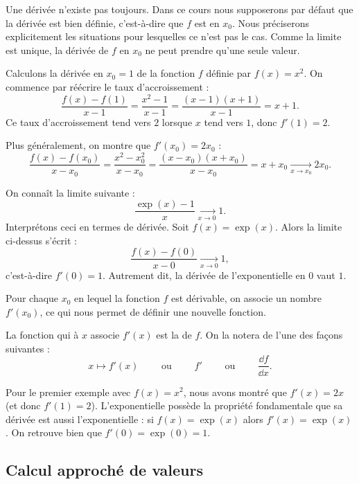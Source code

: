 \documentclass[11pt,class=report,crop=false]{standalone}
\begin{document}
\begin{remarque*}
Une dérivée n'existe pas toujours. Dans ce cours nous supposerons par défaut que la dérivée est bien définie, c'est-à-dire que $f$ est  en $x_0$. Nous préciserons explicitement les situations pour lesquelles ce n'est pas le cas. Comme la limite est unique, la dérivée de $f$ en $x_0$ ne peut prendre qu'une seule valeur.
\end{remarque*}

\begin{exemple}
Calculons la dérivée en $x_0=1$ de la fonction $f$ définie par $f(x)=x^2$.
On commence par réécrire le taux d'accroissement :
$$\frac{f(x)-f(1)}{x-1} = \frac{x^2-1}{x-1} = \frac{(x-1)(x+1)}{x-1}=x+1.$$
Ce taux d'accroissement tend vers $2$ lorsque $x$ tend vers $1$, donc $f'(1)=2$.

Plus généralement, on montre que $f'(x_0)=2x_0$ :
$$\frac{f(x)-f(x_0)}{x-x_0} = \frac{x^2-x_0^2}{x-x_0} = \frac{(x-x_0)(x+x_0)}{x-x_0}=x+x_0 \xrightarrow[x \to x_0]{} 2x_0.$$
\end{exemple}

\begin{exemple}
On connaît la limite suivante :
$$\frac{\exp(x)-1}{x}  \xrightarrow[x \to 0]{} 1.$$
Interprétons ceci en termes de dérivée. Soit $f(x) = \exp(x)$. 
Alors la limite ci-dessus s'écrit :
$$\frac{f(x)-f(0)}{x-0} \xrightarrow[x \to 0]{} 1,$$
c'est-à-dire $f'(0)=1$. Autrement dit, la dérivée de l'exponentielle en $0$ vaut $1$.
\end{exemple} 


Pour chaque $x_0$ en lequel la fonction $f$ est dérivable, on associe un nombre $f'(x_0)$, ce qui nous permet de définir une nouvelle fonction.
\begin{definition}
La fonction qui à $x$ associe $f'(x)$ est la  de $f$.
On la notera de l'une des façons suivantes :
$$x \mapsto f'(x)\qquad \text{ ou } \qquad  f' \qquad \text{ ou } \qquad \frac{\dd f}{\dd x}.$$
\end{definition}

Pour le premier exemple avec $f(x)=x^2$, nous avons montré que $f'(x) = 2x$ (et donc $f'(1)=2$).
L'exponentielle possède la propriété fondamentale que sa dérivée est aussi l'exponentielle :
si $f(x)= \exp(x)$ alors $f'(x)=\exp(x)$. On retrouve bien que $f'(0)=\exp(0)=1$.


\subsection{Calcul approché de valeurs}
\end{document}
